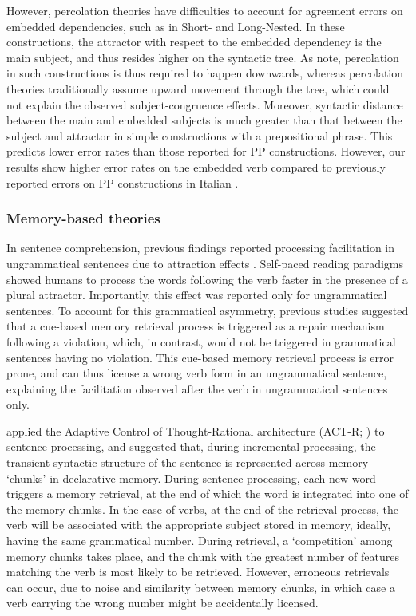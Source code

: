 However, percolation theories have difficulties to account for agreement errors on embedded dependencies, such as in Short- and Long-Nested. In these constructions, the attractor with respect to the embedded dependency is the main subject, and thus resides higher on the syntactic tree. As \citet{wagers2009agreement} note, percolation in such constructions is thus required to happen downwards, whereas percolation theories traditionally assume upward movement through the tree, which could not explain the observed subject-congruence effects. Moreover, syntactic distance between the main and embedded subjects is much greater than that between the subject and attractor in simple constructions with a prepositional phrase. This predicts lower error rates than those reported for PP constructions. However, our results show higher error rates on the embedded verb compared to previously reported errors on PP constructions in Italian \citep{vigliocco1995constructing}.

\subsubsection{Memory-based theories}
In sentence comprehension, previous findings reported processing facilitation in ungrammatical sentences due to attraction effects \citep[e.g., ][]{pearlmutter1999agreement, wagers2009agreement, lago2015agreement}. Self-paced reading paradigms showed humans to process the words following the verb faster in the presence of a plural attractor. Importantly, this effect was reported only for ungrammatical sentences. To account for this grammatical asymmetry, previous studies suggested that a cue-based memory retrieval process \citep{lewis2005activation} is triggered as a repair mechanism following a violation, which, in contrast, would not be triggered in grammatical sentences having no violation. This cue-based memory retrieval process is error prone, and can thus license a wrong verb form in an ungrammatical sentence, explaining the facilitation observed after the verb in ungrammatical sentences only. 

\citet{lewis2005activation} applied the Adaptive Control of Thought-Rational architecture (ACT-R; \citet{anderson2013architecture}) to sentence processing, and suggested that, during incremental processing, the transient syntactic structure of the sentence is represented across memory `chunks’ in declarative memory. During sentence processing, each new word triggers a memory retrieval, at the end of which the word is integrated into one of the memory chunks. In the case of verbs, at the end of the retrieval process, the verb will be associated with the appropriate subject stored in memory, ideally, having the same grammatical number. During retrieval, a `competition' among memory chunks takes place, and the chunk with the greatest number of features matching the verb is most likely to be retrieved. However, erroneous retrievals can occur, due to  noise and similarity between memory chunks, in which case a verb carrying the wrong number might be accidentally licensed. 

